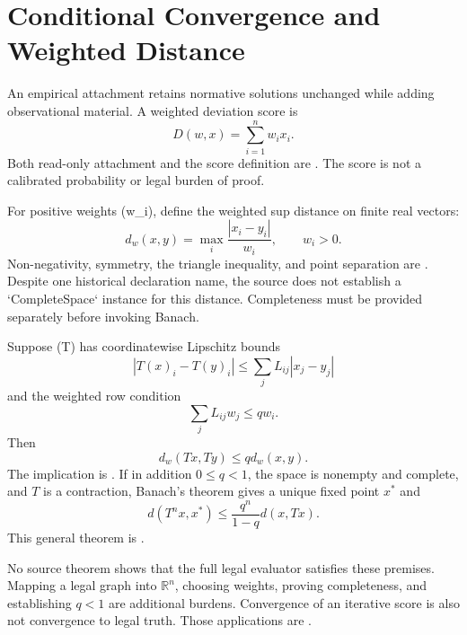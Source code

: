 \section{Conditional Convergence and Weighted Distance}
\label{sec:banach}

An empirical attachment retains normative solutions unchanged while adding observational material. A weighted deviation score is
\begin{equation}
D(w,x)=\sum_{i=1}^{n}w_i x_i.
\label{eq:deviation-score}
\end{equation}
Both read-only attachment and the score definition are \formalized{}. The score is not a calibrated probability or legal burden of proof.

For positive weights (w_i), define the weighted sup distance on finite real vectors:
\begin{equation}
d_w(x,y)=\max_i\frac{|x_i-y_i|}{w_i},\qquad w_i>0.
\label{eq:weighted-sup}
\end{equation}
Non-negativity, symmetry, the triangle inequality, and point separation are \formalized{}. Despite one historical declaration name, the source does not establish a `CompleteSpace` instance for this distance. Completeness must be provided separately before invoking Banach.

Suppose (T) has coordinatewise Lipschitz bounds
\begin{equation}
|T(x)_i-T(y)_i|\le\sum_j L_{ij}|x_j-y_j|
\label{eq:coordinate-lipschitz}
\end{equation}
and the weighted row condition
\begin{equation}
\sum_jL_{ij}w_j\le q w_i.
\label{eq:weighted-row}
\end{equation}
Then
\begin{equation}
d_w(Tx,Ty)\le qd_w(x,y).
\label{eq:weighted-contraction}
\end{equation}
The implication is \formalized{}. If in addition $0\le q<1$, the space is nonempty and complete, and $T$ is a contraction, Banach's theorem \citep{Banach1922} gives a unique fixed point $x^*$ and
\begin{equation}
d(T^n x,x^*)\le\frac{q^n}{1-q}d(x,Tx).
\label{eq:banach-error}
\end{equation}
This general theorem is \formalized{}.

No source theorem shows that the full legal evaluator satisfies these premises. Mapping a legal graph into $\mathbb R^n$, choosing weights, proving completeness, and establishing $q<1$ are additional burdens. Convergence of an iterative score is also not convergence to legal truth. Those applications are \conjectured{}.

